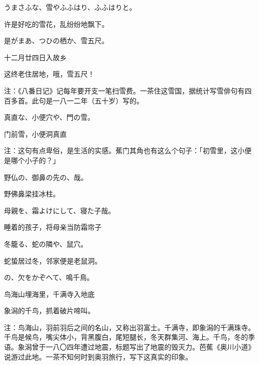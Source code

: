 \begin{haiku}
    {\FH うまさふな、雪やふふはり、ふふはりと。}

    {\FK 许是好吃的雪花，乱纷纷地飘下。}
\end{haiku}

\begin{haiku}
    {\FH 是がまあ、つひの栖か、雪五尺。}

    {\FK 十二月廿四日入故乡}

    {\FK 这终老住居地，哦，雪五尺！}

    {\FT 注：《八番日记》记每年要开支一笔扫雪费。一茶住这雪国，据统计写雪俳句有四百多首。此句是一八一二年（五十岁）写的。}
\end{haiku}

\begin{haiku}
    {\FH 真直な、小便穴や、門の雪。}

    {\FK 门前雪，小便洞真直}

    {\FT 注：这句有点卑俗，是生活的实感。蕉门其角也有这么个句子：「初雪里，这小便是哪个小子的？」}
\end{haiku}

\begin{haiku}
    {\FH 野仏の、御鼻の先の、哉。}

    {\FK 野佛鼻梁挂冰柱。}
\end{haiku}

\begin{haiku}
    {\FH 母親を、霜よけにして、寝た子哉。}

    {\FK 睡着的孩子，将母亲当防霜帘子}
\end{haiku}

\begin{haiku}
    {\FH 冬籠る、蛇の隣や、鼠穴。}

    {\FK 蛇蛰居过冬，邻家便是老鼠洞。}
\end{haiku}

\begin{haiku}
    {\FH {}の、欠をかぞへて、鳴千鳥。}

    {\FK 鸟海山埋海里，千满寺入地底}

    {\FK 象潟的千鸟，抓着破片啼叫。}

    {\FT 注：鸟海山，羽前羽后之间的名山，又称出羽富士。千满寺，即象潟的千满珠寺。千鸟是候鸟，嘴尖体小，背黑腹白，尾短腿长，冬天群集河、海上。千鸟，冬的季语。象潟曾于一八〇四年遭过地震，标题写出了地震的毁灭力。芭蕉《奥川小道》说游过此地。一茶不知何时到奥羽旅行，写下这真实的印象。}
\end{haiku}

